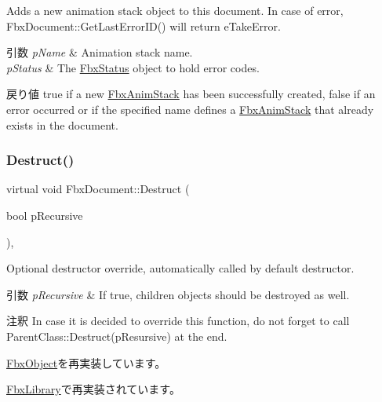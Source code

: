 Adds a new animation stack object to this document. In case of error, Fbx\+Document\+::\+Get\+Last\+Error\+I\+D() will return {\ttfamily e\+Take\+Error}. 
\begin{DoxyParams}{引数}
{\em p\+Name} & Animation stack name. \\
\hline
{\em p\+Status} & The \hyperlink{class_fbx_status}{Fbx\+Status} object to hold error codes. \\
\hline
\end{DoxyParams}
\begin{DoxyReturn}{戻り値}
{\ttfamily true} if a new \hyperlink{class_fbx_anim_stack}{Fbx\+Anim\+Stack} has been successfully created, {\ttfamily false} if an error occurred or if the specified name defines a \hyperlink{class_fbx_anim_stack}{Fbx\+Anim\+Stack} that already exists in the document. 
\end{DoxyReturn}
\mbox{\label{class_fbx_document_a172d19ae540cbd086ade62adaf1a54b8}} 
\subsubsection{\texorpdfstring{Destruct()}{Destruct()}}
{\footnotesize\ttfamily virtual void Fbx\+Document\+::\+Destruct (\begin{DoxyParamCaption}\item[{bool}]{p\+Recursive }\end{DoxyParamCaption})\hspace{0.3cm}{\ttfamily [protected]}, {\ttfamily [virtual]}}

Optional destructor override, automatically called by default destructor. 
\begin{DoxyParams}{引数}
{\em p\+Recursive} & If true, children objects should be destroyed as well. \\
\hline
\end{DoxyParams}
\begin{DoxyRemark}{注釈}
In case it is decided to override this function, do not forget to call Parent\+Class\+::\+Destruct(p\+Resursive) at the end. 
\end{DoxyRemark}


\hyperlink{class_fbx_object_a123e084d9b32b29c28af6384b7c3c608}{Fbx\+Object}を再実装しています。



\hyperlink{class_fbx_library_ad763dd7c511f4c97d1163545de1bbbe9}{Fbx\+Library}で再実装されています。

